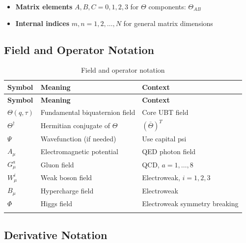 \begin{itemize}
    \item \textbf{Matrix elements} $A, B, C = 0, 1, 2, 3$ for $\Theta$ components: $\Theta_{AB}$
    \item \textbf{Internal indices} $m, n = 1, 2, \ldots, N$ for general matrix dimensions
\end{itemize}

\subsection{Field and Operator Notation}

\begin{longtable}{|l|p{6cm}|p{5cm}|}
\hline
\textbf{Symbol} & \textbf{Meaning} & \textbf{Context} \\
\hline
\endfirsthead
\hline
\textbf{Symbol} & \textbf{Meaning} & \textbf{Context} \\
\hline
\endhead

$\Theta(q,\tau)$ & Fundamental biquaternion field & Core UBT field \\
\hline
$\Theta^\dagger$ & Hermitian conjugate of $\Theta$ & $(\bar{\Theta})^T$ \\
\hline
$\Psi$ & Wavefunction (if needed) & Use capital psi \\
\hline
$A_\mu$ & Electromagnetic potential & QED photon field \\
\hline
$G^a_\mu$ & Gluon field & QCD, $a=1,\ldots,8$ \\
\hline
$W^i_\mu$ & Weak boson field & Electroweak, $i=1,2,3$ \\
\hline
$B_\mu$ & Hypercharge field & Electroweak \\
\hline
$\Phi$ & Higgs field & Electroweak symmetry breaking \\
\hline

\caption{Field and operator notation}
\label{tab:canonical:field_notation}
\end{longtable}

\subsection{Derivative Notation}

